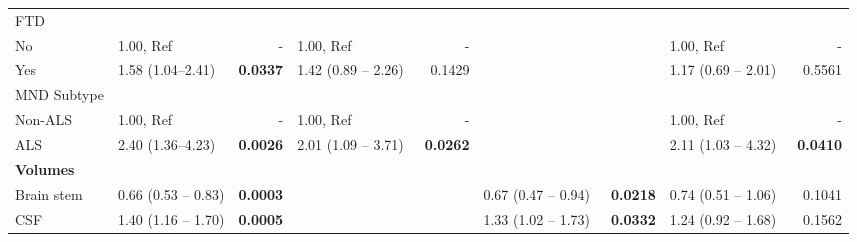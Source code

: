 \begin{sidewaystable}
{\begin{tabular}{|l|lr|lr|lr|lr|}
\hline
FTD &  &  &  &  & {\cellcolor[rgb]{0.753,0.753,0.753}} & {\cellcolor[rgb]{0.753,0.753,0.753}} &  &  \\
\hspace{5mm}No & 1.00, Ref & - & 1.00, Ref & - & {\cellcolor[rgb]{0.753,0.753,0.753}} & {\cellcolor[rgb]{0.753,0.753,0.753}} & 1.00, Ref & - \\
\hspace{5mm}Yes & 1.58 (1.04--2.41) & \textbf{0.0337} & \textcolor[rgb]{0.2,0.2,0.2}{1.42 (0.89 -- 2.26)~} & \textcolor[rgb]{0.2,0.2,0.2}{0.1429} & {\cellcolor[rgb]{0.753,0.753,0.753}} & {\cellcolor[rgb]{0.753,0.753,0.753}} & \textcolor[rgb]{0.2,0.2,0.2}{1.17 (0.69 -- 2.01)~} & \textcolor[rgb]{0.2,0.2,0.2}{0.5561} \\ 
\hline
MND Subtype &  &  &  &  & {\cellcolor[rgb]{0.753,0.753,0.753}} & {\cellcolor[rgb]{0.753,0.753,0.753}} &  &  \\
\hspace{5mm}Non-ALS & 1.00, Ref & - & 1.00, Ref & - & {\cellcolor[rgb]{0.753,0.753,0.753}} & {\cellcolor[rgb]{0.753,0.753,0.753}} & 1.00, Ref & - \\
\hspace{5mm}ALS & 2.40 (1.36--4.23) & \textbf{0.0026} & \textcolor[rgb]{0.2,0.2,0.2}{2.01 (1.09 -- 3.71)~} & \textcolor[rgb]{0.2,0.2,0.2}{\textbf{0.0262}} & {\cellcolor[rgb]{0.753,0.753,0.753}} & {\cellcolor[rgb]{0.753,0.753,0.753}} & \textcolor[rgb]{0.2,0.2,0.2}{2.11 (1.03 -- 4.32)~} & \textcolor[rgb]{0.2,0.2,0.2}{\textbf{0.0410}} \\ 
\hline
\multicolumn{1}{|l}{\textbf{Volumes}} &  & \multicolumn{1}{l}{} &  & \multicolumn{1}{l}{} &  & \multicolumn{1}{l}{} &  &  \\ 
\hline
Brain stem & \textcolor[rgb]{0.2,0.2,0.2}{0.66 (0.53 -- 0.83)} & \textcolor[rgb]{0.2,0.2,0.2}{\textbf{0.0003}} & {\cellcolor[rgb]{0.753,0.753,0.753}} & {\cellcolor[rgb]{0.753,0.753,0.753}} & \textcolor[rgb]{0.2,0.2,0.2}{0.67 (0.47 -- 0.94)~} & \textcolor[rgb]{0.2,0.2,0.2}{\textbf{0.0218}} & \textcolor[rgb]{0.2,0.2,0.2}{0.74 (0.51 -- 1.06)~} & \textcolor[rgb]{0.2,0.2,0.2}{0.1041} \\ 
\hline
CSF & \textcolor[rgb]{0.2,0.2,0.2}{1.40 (1.16 -- 1.70)} & \textcolor[rgb]{0.2,0.2,0.2}{\textbf{0.0005}} & {\cellcolor[rgb]{0.753,0.753,0.753}} & {\cellcolor[rgb]{0.753,0.753,0.753}} & \textcolor[rgb]{0.2,0.2,0.2}{1.33 (1.02 -- 1.73)~} & \textcolor[rgb]{0.2,0.2,0.2}{\textbf{0.0332}} & \textcolor[rgb]{0.2,0.2,0.2}{1.24 (0.92 -- 1.68)~} & \textcolor[rgb]{0.2,0.2,0.2}{0.1562} \\ 

\end{tabular}}
\end{sidewaystable}
